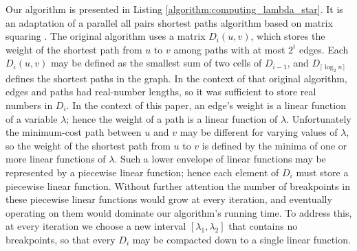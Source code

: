 \documentclass{llncs}
\begin{document}
Our algorithm is presented in Listing \ref{algorithm:computing_lambda_star}.  It is an adaptation of a parallel all pairs shortest paths algorithm based on matrix squaring \cite{savage77}.  The original algorithm uses a matrix $D_i(u,v)$, which stores the weight of the shortest path from $u$ to $v$ among paths with at most $2^i$ edges.  Each $D_i(u,v)$ may be defined as the smallest sum of two cells of $D_{i-1}$, and $D_{\lceil \log_2 n \rceil}$ defines the shortest paths in the graph.  In the context of that original algorithm, edges and paths had real-number lengths, so it was sufficient to store real numbers in $D_i$.  In the context of this paper, an edge's weight is a linear function of a variable $\lambda$; hence the weight of a path is a linear function of $\lambda$.  Unfortunately the minimum-cost path between $u$ and $v$ may be different for varying values of $\lambda$, so the weight of the shortest path from $u$ to $v$ is defined by the minima of one or more linear functions of $\lambda$.  Such a lower envelope of linear functions may be represented by a piecewise linear function; hence each element of $D_i$ must store a piecewise linear function.  Without further attention the number of breakpoints in these piecewise linear functions would grow at every iteration, and eventually operating on them would dominate our algorithm's running time.  To address this, at every iteration we choose a new interval $[\lambda_1, \lambda_2]$ that contains no breakpoints, so that every $D_i$ may be compacted down to a single linear function.
\end{document}
